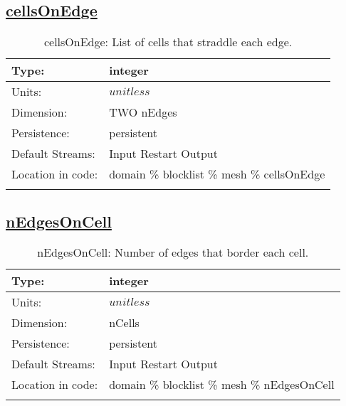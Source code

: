 \subsection[cellsOnEdge]{\hyperref[sec:var_tab_mesh]{cellsOnEdge}}
\label{subsec:var_sec_mesh_cellsOnEdge}
\begin{center}
\begin{longtable}{| p{2.0in} | p{4.0in} |}
        \hline 
        Type: & integer \\
        \hline 
        Units: & $unitless$ \\
        \hline 
        Dimension: & TWO nEdges \\
        \hline 
        Persistence: & persistent \\
        \hline 
		 Default Streams: & Input Restart Output  \\
        \hline 
		 Location in code: & domain \% blocklist \% mesh \% cellsOnEdge \\
		 \hline 
    \caption{cellsOnEdge: List of cells that straddle each edge.}
\end{longtable}
\end{center}
\subsection[nEdgesOnCell]{\hyperref[sec:var_tab_mesh]{nEdgesOnCell}}
\label{subsec:var_sec_mesh_nEdgesOnCell}
\begin{center}
\begin{longtable}{| p{2.0in} | p{4.0in} |}
        \hline 
        Type: & integer \\
        \hline 
        Units: & $unitless$ \\
        \hline 
        Dimension: & nCells \\
        \hline 
        Persistence: & persistent \\
        \hline 
		 Default Streams: & Input Restart Output  \\
        \hline 
		 Location in code: & domain \% blocklist \% mesh \% nEdgesOnCell \\
		 \hline 
    \caption{nEdgesOnCell: Number of edges that border each cell.}
\end{longtable}
\end{center}
